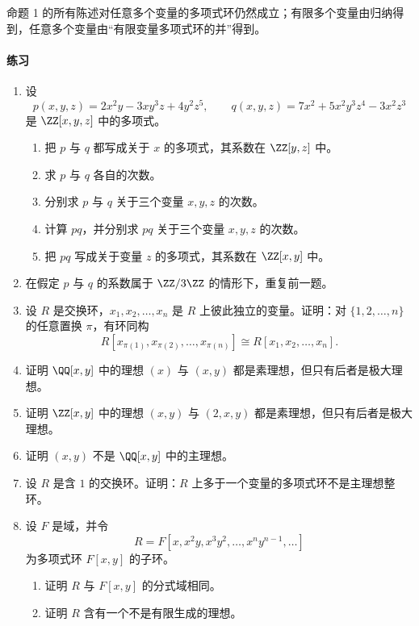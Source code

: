命题 1 的所有陈述对任意多个变量的多项式环仍然成立；有限多个变量由归纳得到，任意多个变量由“有限变量多项式环的并”得到。


\paragraph{练习}
\begin{enumerate}[label=\arabic*.]
	\item 设
	\[
	p(x,y,z)=2x^2y-3xy^3z+4y^2z^5,
	\qquad q(x,y,z)=7x^2+5x^2y^3z^4-3x^2z^3
	\]
	是 $\ZZ[x,y,z]$ 中的多项式。
	\begin{enumerate}[label=(\alph*)]
		\item 把 $p$ 与 $q$ 都写成关于 $x$ 的多项式，其系数在 $\ZZ[y,z]$ 中。
		\item 求 $p$ 与 $q$ 各自的次数。
		\item 分别求 $p$ 与 $q$ 关于三个变量 $x,y,z$ 的次数。
		\item 计算 $pq$，并分别求 $pq$ 关于三个变量 $x,y,z$ 的次数。
		\item 把 $pq$ 写成关于变量 $z$ 的多项式，其系数在 $\ZZ[x,y]$ 中。
	\end{enumerate}
	
	\item 在假定 $p$ 与 $q$ 的系数属于 $\ZZ/3\ZZ$ 的情形下，重复前一题。
	
	\item 设 $R$ 是交换环，$x_1,x_2,\ldots,x_n$ 是 $R$ 上彼此独立的变量。证明：对 $\{1,2,\ldots,n\}$ 的任意置换 $\pi$，有环同构
	\[
	R[x_{\pi(1)},x_{\pi(2)},\ldots,x_{\pi(n)}]\cong R[x_1,x_2,\ldots,x_n].
	\]
	
	\item 证明 $\QQ[x,y]$ 中的理想 $(x)$ 与 $(x,y)$ 都是素理想，但只有后者是极大理想。
	
	\item 证明 $\ZZ[x,y]$ 中的理想 $(x,y)$ 与 $(2,x,y)$ 都是素理想，但只有后者是极大理想。
	
	\item 证明 $(x,y)$ 不是 $\QQ[x,y]$ 中的主理想。
	
	\item 设 $R$ 是含 $1$ 的交换环。证明：$R$ 上多于一个变量的多项式环不是主理想整环。
	
	\item 设 $F$ 是域，并令
	\[
	R=F[x,x^2y,x^3y^2,\ldots,x^ny^{n-1},\ldots]
	\]
	为多项式环 $F[x,y]$ 的子环。
	\begin{enumerate}[label=(\alph*)]
		\item 证明 $R$ 与 $F[x,y]$ 的分式域相同。
		\item 证明 $R$ 含有一个不是有限生成的理想。
	\end{enumerate}
	

\end{enumerate}
